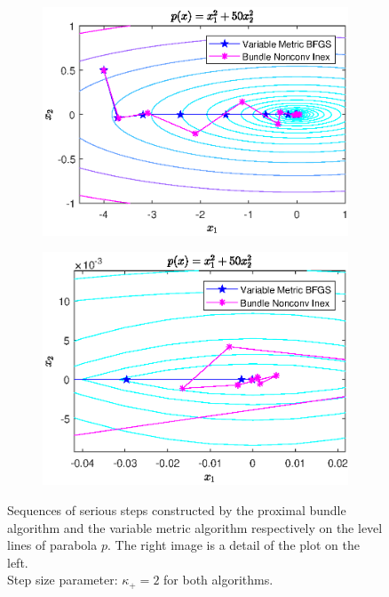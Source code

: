 \begin{figure}[ht]
	\begin{subfigure}[t]{0.49\textwidth}
		\includegraphics[width=\textwidth]{Pictures/Plots/final_parab.eps}
	\end{subfigure}
	\begin{subfigure}[t]{0.49\textwidth}
			\includegraphics[width=\textwidth]{Pictures/Plots/final_parab_detail.eps}
	\end{subfigure}
	\caption[Serious steps on parabola]{Sequences of serious steps constructed by the proximal bundle algorithm and the variable metric algorithm respectively on the level lines of parabola \(p\). The right image is a detail of the plot on the left.\\
	Step size parameter: \(\kappa_+ = 2\) for both algorithms.}
	\label{fig_contour_parab}
\end{figure}

